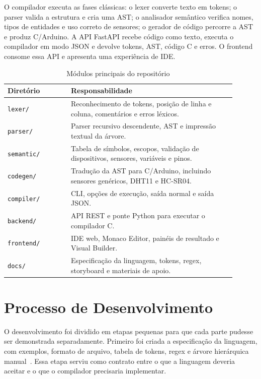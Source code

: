 \documentclass[conference]{IEEEtran}
\begin{document}
O compilador executa as fases clássicas: o lexer converte texto em tokens; o parser valida a estrutura e cria uma AST; o analisador semântico verifica nomes, tipos de entidades e uso correto de sensores; o gerador de código percorre a AST e produz C/Arduino. A API FastAPI recebe código como texto, executa o compilador em modo JSON e devolve tokens, AST, código C e erros. O frontend consome essa API e apresenta uma experiência de IDE.

\begin{table}[htbp]
\caption{Módulos principais do repositório}
\label{tab:modulos}
\centering
\begin{tabular}{p{0.25\linewidth}p{0.65\linewidth}}
\toprule
\textbf{Diretório} & \textbf{Responsabilidade} \\
\midrule
\texttt{lexer/} & Reconhecimento de tokens, posição de linha e coluna, comentários e erros léxicos. \\
\texttt{parser/} & Parser recursivo descendente, AST e impressão textual da árvore. \\
\texttt{semantic/} & Tabela de símbolos, escopos, validação de dispositivos, sensores, variáveis e pinos. \\
\texttt{codegen/} & Tradução da AST para C/Arduino, incluindo sensores genéricos, DHT11 e HC-SR04. \\
\texttt{compiler/} & CLI, opções de execução, saída normal e saída JSON. \\
\texttt{backend/} & API REST e ponte Python para executar o compilador C. \\
\texttt{frontend/} & IDE web, Monaco Editor, painéis de resultado e Visual Builder. \\
\texttt{docs/} & Especificação da linguagem, tokens, regex, storyboard e materiais de apoio. \\
\bottomrule
\end{tabular}
\end{table}

\section{Processo de Desenvolvimento}
O desenvolvimento foi dividido em etapas pequenas para que cada parte pudesse ser demonstrada separadamente. Primeiro foi criada a especificação da linguagem, com exemplos, formato de arquivo, tabela de tokens, regex e árvore hierárquica manual~\cite{docs-def,docs-tokens}. Essa etapa serviu como contrato entre o que a linguagem deveria aceitar e o que o compilador precisaria implementar.
\end{document}
